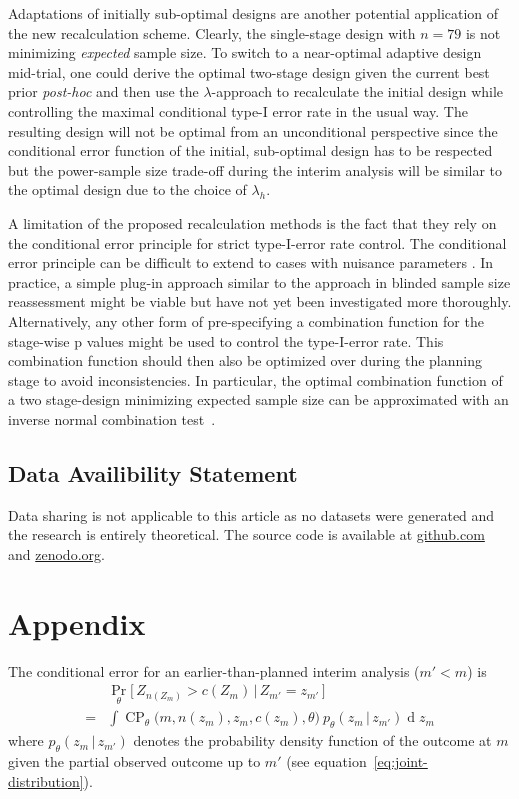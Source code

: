 \documentclass[12pt]{article}
\renewcommand{\Pr}{\operatorname{Pr}}
\newcommand{\CP}{\ensuremath{\operatorname{CP}}}
\renewcommand{\Pr}{\ensuremath{\operatorname{Pr}}}
\newcommand{\cond}{\ensuremath{\,|\,}}
\begin{document}
Adaptations of initially sub-optimal designs are another potential
application of the new recalculation scheme.
Clearly, the single-stage design with $n=79$ is not minimizing
\emph{expected} sample size.
To switch to a near-optimal adaptive design mid-trial,
one could derive the optimal two-stage design given the current best prior \textit{post-hoc} and
then use the $\lambda$-approach to recalculate the initial design while controlling the maximal
conditional type-I error rate in the usual way.
The resulting design will not be optimal from an unconditional perspective since the conditional error function of the initial, sub-optimal design has to be respected but the power-sample size trade-off during the interim analysis
will be similar to the optimal design due to the choice of $\lambda_h$.

A limitation of the proposed recalculation methods is the fact that they
rely on the conditional error principle for strict type-I-error rate control.
The conditional error principle can be difficult to extend to cases with nuisance
parameters \cite{gutjahr2011}.
In practice, a simple plug-in approach similar to the approach in blinded sample size reassessment might be viable but have not yet been investigated more thoroughly.
Alternatively, any other form of pre-specifying a combination function for the stage-wise p values might be used to control the type-I-error rate.
This combination function should then also be optimized over during the planning stage
to avoid inconsistencies.
In particular, the optimal combination function of a two stage-design minimizing expected sample size can be approximated with an inverse normal combination test~\cite{pilz2019}.

\subsection*{Data Availibility Statement}
Data sharing is not applicable to this article as no datasets were generated and
the research is entirely theoretical.
The source code is available at
\href{https://github.com/kkmann/unblinded-sample-size-adaptation}{github.com}
and
\href{https://doi.org/10.5281/zenodo.3925752}{zenodo.org}.






\section*{Appendix}

The conditional error for an earlier-than-planned interim analysis ($m'<m$)
is
\begin{align}
    & \Pr_\theta\big[\,Z_{n(Z_m)} > c(Z_m) \cond Z_{m'} = z_{m'}\,\big] \\
    =& \int \CP_\theta\big(m,n(z_m),z_m, c(z_m), \theta\big)\  p_\theta(z_m \cond z_{m'}) \operatorname{d} z_m
\end{align}
where $p_\theta(z_m \cond z_{m'})$ denotes the probability density function of the outcome at $m$ given the partial observed outcome up to $m'$ (see equation~\eqref{eq:joint-distribution}).
\end{document}
